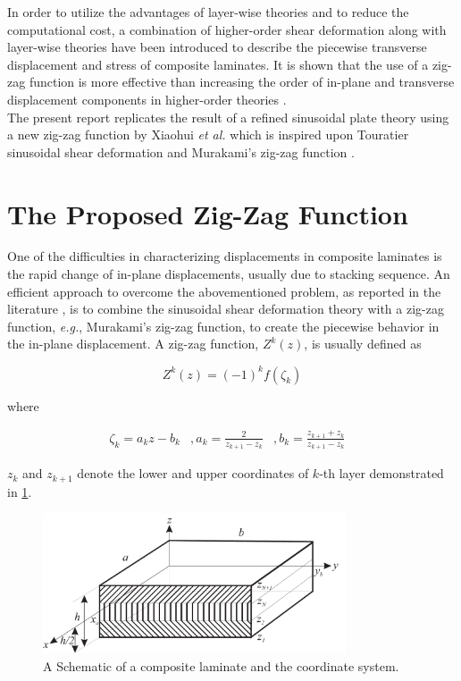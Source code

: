 \documentclass{article}
\begin{document}
In order to utilize the advantages of layer-wise theories and to reduce the computational cost, a combination of higher-order shear deformation along with layer-wise theories have been introduced to describe the piecewise transverse displacement and stress of composite laminates. It is shown that the use of a zig-zag function is more effective than increasing the order of in-plane and transverse displacement components in higher-order theories \cite{Carrera2004}.\\

The present report replicates the result of a refined sinusoidal plate theory using a new zig-zag function by Xiaohui \emph{et al.} \cite{Xiaohui2020} which is inspired upon Touratier \cite{Touratier1991} sinusoidal shear deformation and Murakami's zig-zag function \cite{Murakami1986}. 

\section{The Proposed Zig-Zag Function}
One of the difficulties in characterizing displacements in composite laminates is the rapid change of in-plane displacements, usually due to stacking sequence. An efficient approach to overcome the abovementioned problem, as reported in the literature \cite{Carrera2004}, is to combine the sinusoidal shear deformation theory with a zig-zag function, \emph{e.g.}, Murakami's zig-zag function, to create the piecewise behavior in the in-plane displacement. A zig-zag function, $Z^k(z)$, is usually defined as 

\begin{equation}
    Z^k(z) = (-1)^k f(\zeta_k)
    \label{eq:zigzag}
\end{equation}

where

\begin{equation*}
    \begin{matrix}
    \zeta_k = a_k z - b_k & , 
     a_k = \frac{2}{z_{k+1} - z_k} & , 
     b_k = \frac{z_{k+1} + z_k}{z_{k+1} - z_k} & 
    \end{matrix}
\end{equation*}

$z_k$ and $z_{k+1}$ denote the lower and upper coordinates of $k$-th layer demonstrated in \cref{fig:laminate}. \\

\begin{figure}[H]
    \centering
    \includegraphics[width = 0.8\textwidth ]{figures/laminate.pdf}
    \caption{A Schematic of a composite laminate and the coordinate system.}
    \label{fig:laminate}
\end{figure}
\end{document}
